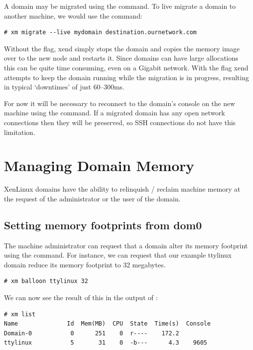 \documentclass[11pt,twoside,final,openright]{report}
\def\xend{{xend}\xspace}
\begin{document}
A domain may be migrated using the  command.  To
live migrate a domain to another machine, we would use
the command:

\begin{verbatim}
# xm migrate --live mydomain destination.ournetwork.com
\end{verbatim}

Without the  flag, \xend simply stops the domain and
copies the memory image over to the new node and restarts it. Since
domains can have large allocations this can be quite time consuming,
even on a Gigabit network. With the  flag \xend attempts
to keep the domain running while the migration is in progress,
resulting in typical `downtimes' of just 60--300ms.

For now it will be necessary to reconnect to the domain's console on
the new machine using the  command.  If a migrated
domain has any open network connections then they will be preserved,
so SSH connections do not have this limitation.

\section{Managing Domain Memory}

XenLinux domains have the ability to relinquish / reclaim machine
memory at the request of the administrator or the user of the domain.

\subsection{Setting memory footprints from dom0}

The machine administrator can request that a domain alter its memory
footprint using the  command.  For instance, we can
request that our example ttylinux domain reduce its memory footprint
to 32 megabytes.

\begin{verbatim}
# xm balloon ttylinux 32
\end{verbatim}

We can now see the result of this in the output of :

\begin{verbatim}
# xm list
Name              Id  Mem(MB)  CPU  State  Time(s)  Console
Domain-0           0      251    0  r----    172.2        
ttylinux           5       31    0  -b---      4.3    9605
\end{verbatim}
\end{document}
